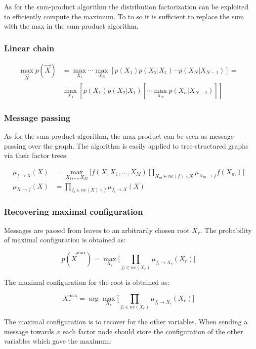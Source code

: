 	As for the sum-product algorithm the distribution factorization can be exploited to efficiently compute the maximum.
	To to so it is sufficient to replace the sum with the max in the sum-product algorithm.

		\subsubsection{Linear chain}

		\begin{align*}
			\max\limits_{\vec{X}}p(\vec{X}) &= \max\limits_{X_1}\cdots\max\limits_{X_N}[p(X_1)p(X_2|X_1)\cdots p(X_N|X_{N-1})]=\\
																			&\max\limits_{X_1}[p(X_1)p(X_2|X_1)[\cdots\max\limits_{X_N}p(X_n|X_{N-1})]]
		\end{align*}

		\subsubsection{Message passing}
		As for the sum-product algorithm, the max-product can be seen as message passing over the graph.
		The algorithm is easily applied to tree-structured graphs via their factor trees:

		\begin{align*}
			\mu_{f\rightarrow X}(X) &= \max\limits_{X_1, \dots, X_M}\biggl[f(X, X_1,\dots, X_M)\prod\limits_{X_m\in ne(f)\backslash X}\mu_{X_m\rightarrow f}f(X_m)\biggr]\\
			\mu_{X\rightarrow f}(X) &= \prod\limits_{f_l\in ne(X)\backslash f}\mu_{f_l\rightarrow X}(X)
		\end{align*}

		\subsubsection{Recovering maximal configuration}
		Messages are passed from leaves to an arbitrarily chosen root $X_r$.
		The probability of maximal configuration is obtained as:

		$$p(\vec{X}^{\max}) = \max\limits_{X_r}\biggl[\prod\limits_{f_l\in ne(X_r)}\mu_{f_l\rightarrow X_r}(X_r)\biggr]$$

		The maximal configuration for the root is obtained as:

		$$X_r^{\max} = \arg\max\limits_{X_r}\biggl[\prod\limits_{f_l\in ne(X_r)}\mu_{f_l\rightarrow X_r}(X_r)\biggr]$$

		The maximal configuration is to recover for the other variables.
		When sending a message towards $x$ each factor node should store the configuration of the other variables which gave the maximum:

